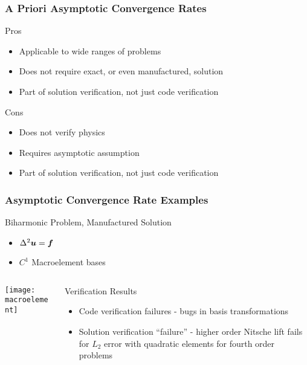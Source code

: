 \begin{frame}
\frametitle{A Priori Asymptotic Convergence Rates}
\begin{block}{Pros}
\begin{itemize}
\item Applicable to wide ranges of problems
\item Does not require exact, or even manufactured, solution
\item Part of solution verification, not just code verification
\end{itemize}
\end{block}

\pause

\begin{block}{Cons}
\begin{itemize}
\item Does not verify physics
\item Requires asymptotic assumption
\item Part of solution verification, not just code verification
\end{itemize}
\end{block}

\end{frame}

\begin{frame}
\frametitle{Asymptotic Convergence Rate Examples}
\begin{block}{Biharmonic Problem, Manufactured Solution}
\begin{itemize}
\item $\Delta^2 {\boldsymbol{u}} = {\boldsymbol{f}}$
\item $C^1$ Macroelement bases
\end{itemize}
\end{block}

\begin{columns}
\begin{column}{.5\textwidth}
\texttt{[image: macroelement]}
\end{column}
\begin{column}{.5\textwidth}
\begin{block}{Verification Results}
\begin{itemize}
\item Code verification failures - bugs in basis transformations
\item Solution verification ``failure'' - higher order Nitsche lift
fails for $L_2$ error with quadratic elements for fourth order problems
\end{itemize}
\end{block}
\end{column}
\end{columns}

\end{frame}

